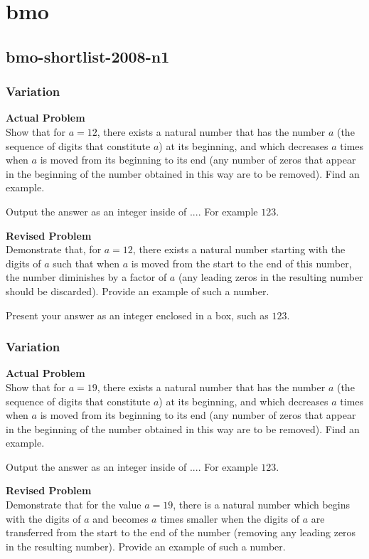 \section{bmo}
\subsection{bmo-shortlist-2008-n1}
\subsubsection{Variation}
\textbf{Actual Problem}\\
Show that for $a=12$, there exists a natural number that has the number $a$ (the sequence of digits that constitute $a$) at its beginning, and which decreases $a$ times when $a$ is moved from its beginning to its end (any number of zeros that appear in the beginning of the number obtained in this way are to be removed). Find an example.

Output the answer as an integer inside of $\boxed{...}$. For example $\boxed{123}$.

\textbf{Revised Problem}\\
Demonstrate that, for $a=12$, there exists a natural number starting with the digits of $a$ such that when $a$ is moved from the start to the end of this number, the number diminishes by a factor of $a$ (any leading zeros in the resulting number should be discarded). Provide an example of such a number.

Present your answer as an integer enclosed in a box, such as $\boxed{123}$.

\subsubsection{Variation}
\textbf{Actual Problem}\\
Show that for $a=19$, there exists a natural number that has the number $a$ (the sequence of digits that constitute $a$) at its beginning, and which decreases $a$ times when $a$ is moved from its beginning to its end (any number of zeros that appear in the beginning of the number obtained in this way are to be removed). Find an example.

Output the answer as an integer inside of $\boxed{...}$. For example $\boxed{123}$.

\textbf{Revised Problem}\\
Demonstrate that for the value \( a = 19 \), there is a natural number which begins with the digits of \( a \) and becomes \( a \) times smaller when the digits of \( a \) are transferred from the start to the end of the number (removing any leading zeros in the resulting number). Provide an example of such a number.

